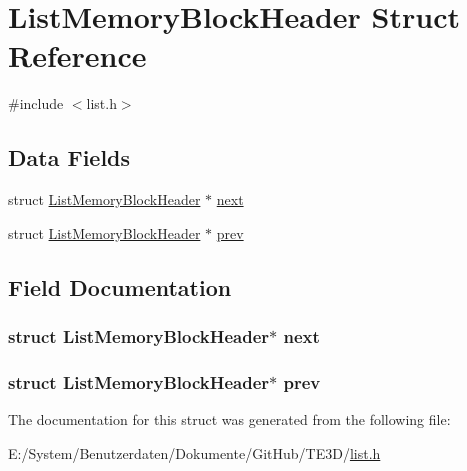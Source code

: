 \hypertarget{struct_list_memory_block_header}{\section{List\-Memory\-Block\-Header Struct Reference}
\label{struct_list_memory_block_header}
}


{\ttfamily \#include $<$list.\-h$>$}

\subsection*{Data Fields}
\begin{DoxyCompactItemize}
\item 
struct \hyperlink{struct_list_memory_block_header}{List\-Memory\-Block\-Header} $\ast$ \hyperlink{struct_list_memory_block_header_aeb4318b8c07d7035f19be4c85bee6e78}{next}
\item 
struct \hyperlink{struct_list_memory_block_header}{List\-Memory\-Block\-Header} $\ast$ \hyperlink{struct_list_memory_block_header_a0a2cc3c0c86933e07d7871bc1fccdfe5}{prev}
\end{DoxyCompactItemize}


\subsection{Field Documentation}
\hypertarget{struct_list_memory_block_header_aeb4318b8c07d7035f19be4c85bee6e78}{
\subsubsection[{next}]{\setlength{\rightskip}{0pt plus 5cm}struct {\bf List\-Memory\-Block\-Header}$\ast$ next}}\label{struct_list_memory_block_header_aeb4318b8c07d7035f19be4c85bee6e78}
\hypertarget{struct_list_memory_block_header_a0a2cc3c0c86933e07d7871bc1fccdfe5}{
\subsubsection[{prev}]{\setlength{\rightskip}{0pt plus 5cm}struct {\bf List\-Memory\-Block\-Header}$\ast$ prev}}\label{struct_list_memory_block_header_a0a2cc3c0c86933e07d7871bc1fccdfe5}


The documentation for this struct was generated from the following file\-:\begin{DoxyCompactItemize}
\item 
E\-:/\-System/\-Benutzerdaten/\-Dokumente/\-Git\-Hub/\-T\-E3\-D/\hyperlink{list_8h}{list.\-h}\end{DoxyCompactItemize}
